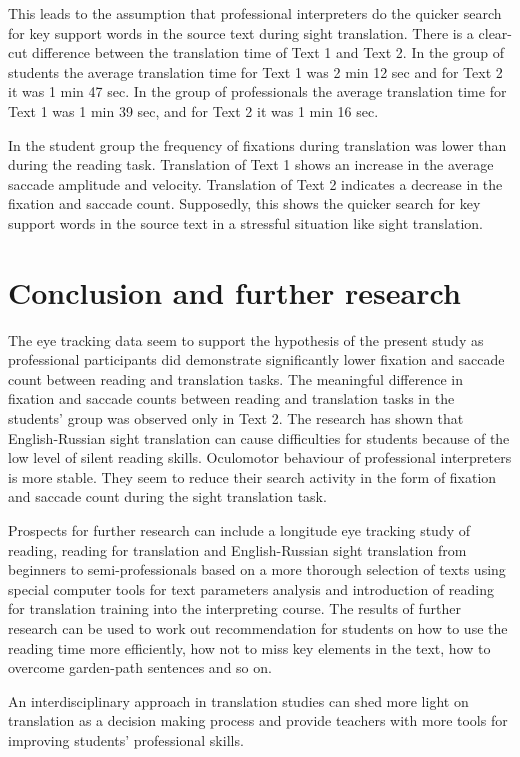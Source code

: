 \documentclass[output=paper]{langscibook}
\begin{document}
This leads to the assumption that professional interpreters do the quicker search for key support words in the source text during sight translation. There is a clear-cut difference between the translation time of Text 1 and Text 2. In the group of students the average translation time for Text 1 was 2 min 12 sec and for Text 2 it was 1 min 47 sec. In the group of professionals the average translation time for Text 1 was 1 min 39 sec, and for Text 2 it was 1 min 16 sec.

In the student group the frequency of fixations during translation was lower than during the reading task. Translation of Text 1 shows an increase in the average saccade amplitude and velocity. Translation of Text 2 indicates a decrease in the fixation and saccade count. Supposedly, this shows the quicker search for key support words in the source text in a stressful situation like sight translation.

\section{Conclusion and further research}
The eye tracking data seem to support the hypothesis of the present study as professional participants did demonstrate significantly lower fixation and saccade count between reading and translation tasks. The meaningful difference in fixation and saccade counts between reading and translation tasks in the students’ group was observed only in Text 2. The research has shown that English-Russian sight translation can cause difficulties for students because of the low level of silent reading skills. Oculomotor behaviour of professional interpreters is more stable. They seem to reduce their search activity in the form of fixation and saccade count during the sight translation task.

Prospects for further research can include a longitude eye tracking study of reading, reading for translation and English-Russian sight translation from beginners to semi-professionals based on a more thorough selection of texts using special computer tools for text parameters analysis and introduction of reading for translation training into the interpreting course. The results of further research can be used to work out recommendation for students on how to use the reading time more efficiently, how not to miss key elements in the text, how to overcome garden-path sentences and so on.

An interdisciplinary approach in translation studies can shed more light on translation as a decision making process and provide teachers with more tools for improving students’ professional skills.
    

{\sloppy\printbibliography[heading=subbibliography,notkeyword=this]}
\end{document}
